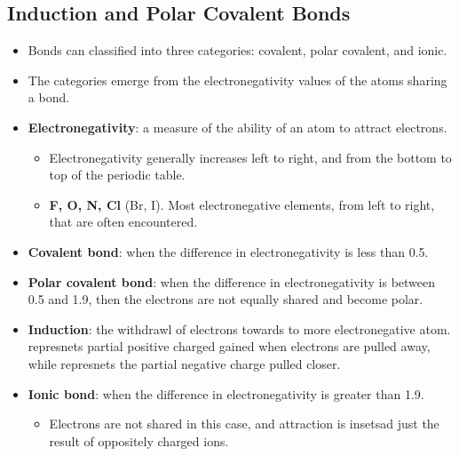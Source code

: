 \documentclass[12pt,a4paper]{article}
\begin{document}
\subsection{Induction and Polar Covalent Bonds}
\begin{itemize}
    \item Bonds can classified into three categories: covalent, polar covalent, and ionic.
    \item The categories emerge from the electronegativity values of the atoms sharing a bond.
    \item \textbf{Electronegativity}: a measure of the ability of an atom to attract electrons.
        \begin{itemize}
            \item Electronegativity generally {\color{o-Sun}increases left to right}, and from the {\color{o-Sun}bottom to top} of the periodic table.
            \item \textbf{F, O, N, Cl} (Br, I). Most electronegative elements, from left to right, that are often encountered.
        \end{itemize}
    \item \textbf{Covalent bond}: when the difference in electronegativity is {\color{o-Sun}less than 0.5}.
    \item \textbf{Polar covalent bond}: when the difference in electronegativity is {\color{o-Sun}between 0.5 and 1.9}, then the electrons are not equally shared and become polar.
    \item \textbf{Induction}: the withdrawl of electrons towards to more electronegative atom. {\color{pos}\ch{$\delta$^+}} represnets partial positive charged gained when electrons are pulled away, while {\color{neg}\ch{$\delta$^-}} represnets the partial negative charge pulled closer.
    \item \textbf{Ionic bond}: when the difference in electronegativity is {\color{o-Sun}greater than 1.9}.
        \begin{itemize}
            \item Electrons are not shared in this case, and attraction is insetsad just the result of oppositely charged ions.
        \end{itemize}

\end{itemize}
\end{document}
